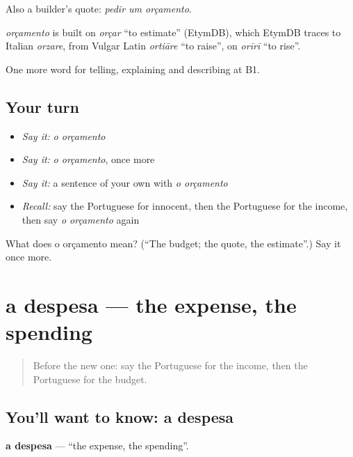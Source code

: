 Also a builder's quote: \emph{pedir um orçamento}.

\begin{cousinweb}
\emph{orçamento} is built on \emph{orçar} \textquotedblleft{}to estimate\textquotedblright{} (EtymDB), which EtymDB traces to Italian \emph{orzare}, from Vulgar Latin \emph{ortiāre} \textquotedblleft{}to raise\textquotedblright{}, on \emph{orīrī} \textquotedblleft{}to rise\textquotedblright{}.
\end{cousinweb}

\begin{grammarlens}[title={What you've built}]
One more word for telling, explaining and describing at B1.
\end{grammarlens}

\subsection*{Your turn}
\begin{itemize}
\raggedright
  \item \emph{Say it:} \emph{o orçamento}
  \item \emph{Say it:} \emph{o orçamento}, once more
  \item \emph{Say it:} a sentence of your own with \emph{o orçamento}
  \item \emph{Recall:} say the Portuguese for innocent, then the Portuguese for the income, then say \emph{o orçamento} again
\end{itemize}

\begin{tcolorbox}[breakable,colback=teal!4,colframe=teal!35!black,title={Before you move on}]
What does o orçamento mean? (\textquotedblleft{}The budget; the quote, the estimate\textquotedblright{}.) Say it once more.
\end{tcolorbox}
\section[a despesa]{a despesa — the expense, the spending}

\label{lesson:PT-C391-despesa}



\begin{quote}
Before the new one: say the Portuguese for the income, then the Portuguese for the budget.
\end{quote}

\subsection*{You'll want to know: a despesa}
\textbf{a despesa} — \textquotedblleft{}the expense, the spending\textquotedblright{}.

